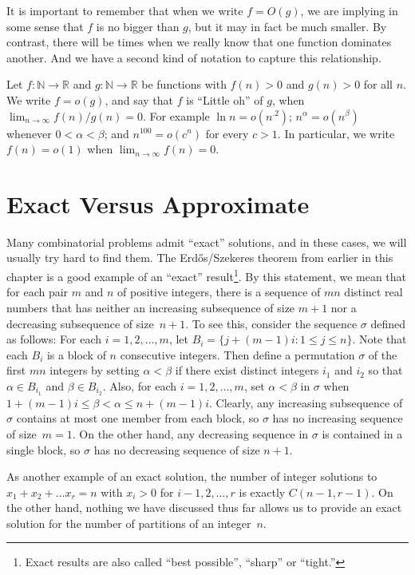 It is important to remember that when we write $f=O(g)$, we are
implying in some sense that $f$ is no bigger than $g$, but it
may in fact be much smaller.  By contrast, there will be times
when we really know that one function dominates
another.  And we have a second kind of notation to capture this
relationship.

Let $f:\mathbb{N}\longrightarrow \mathbb{R}$ and
$g:\mathbb{N}\longrightarrow\mathbb{R}$ be functions with
$f(n)>0$ and $g(n)>0$ for all $n$.  We write $f=o(g)$, and 
say that $f$ is ``Little oh'' of $g$, when 
$\lim_{n\rightarrow\infty}f(n)/g(n)=0$. 
For example $\ln n=o(n^{.2})$; $n^\alpha=o(n^{\beta})$ whenever
$0<\alpha<\beta$; and $n^{100}=o(c^n)$ for every $c>1$.
In particular, we write $f(n)=o(1)$ when $\lim_{n\rightarrow\infty}f(n)=0$.

\section{Exact Versus Approximate}\label{s:basics:exact}

Many combinatorial problems admit ``exact'' solutions, and in these
cases, we will usually try hard to find them.  The Erd\H{o}s/Szekeres
theorem from earlier in this chapter is a good example of an
``exact'' result\footnote{Exact results are also called ``best possible'', ``sharp'' 
or ``tight.''}.  By this statement,
we mean that for each pair $m$ and $n$ of positive integers, there
is a sequence of $mn$ distinct real numbers that has neither
an increasing subsequence of size $m+1$ nor a decreasing subsequence
of size~$n+1$.  To see this, consider the sequence $\sigma$ defined
as follows: For each $i=1,2,\dots,m$,
let $B_i=\{j+(m-1)i:1\le j\le n\}$.  Note that each $B_i$ is a block
of $n$ consecutive integers.  Then define a permutation $\sigma$ of
the first $mn$ integers by setting $\alpha<\beta$ if there exist
distinct integers $i_1$ and $i_2$ so that $\alpha\in B_{i_1}$ and
$\beta\in B_{i_2}$.  Also, for each $i=1,2,\dots,m$, set $\alpha<\beta$
in $\sigma$ when $1+(m-1)i\le \beta<\alpha\le n+(m-1)i$.  Clearly,
any increasing subsequence of $\sigma$ contains at most one member
from each block, so $\sigma$ has no increasing sequence of size~$m=1$.
On the other hand, any decreasing sequence in $\sigma$ is contained
in a single block, so $\sigma$ has no decreasing sequence of size $n+1$.

As another example of an exact solution, the number of integer solutions 
to $x_1+x_2+\dots x_r=n$ with $x_i>0$ for $i-1,2,\dots,r$ is exactly $C(n-1,r-1)$.
On the other hand, nothing we have discussed thus far allows us to provide
an exact solution for the number of partitions of an integer~$n$.


